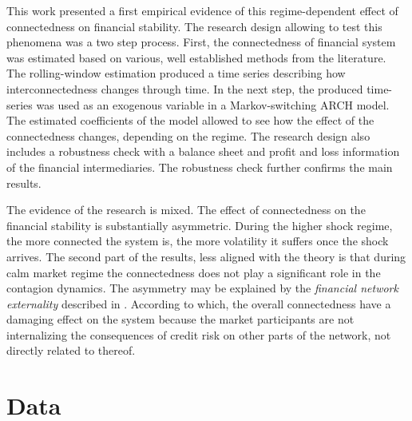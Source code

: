 \documentclass[12pt]{article}
\begin{document}
This work presented a first empirical evidence of this regime-dependent effect of connectedness on financial stability. The research design allowing to test this phenomena was a two step process. First, the connectedness of financial system was estimated based on various, well established methods from the literature. The rolling-window estimation produced a time series describing how interconnectedness changes through time. In the next step, the produced time-series was used as an exogenous variable in a Markov-switching ARCH model. The estimated coefficients of the model allowed to see how the effect of the connectedness changes, depending on the regime. The research design also includes a robustness check with a balance sheet and profit and loss information of the financial intermediaries. The robustness check further confirms the main results.

The evidence of the research is mixed. The effect of connectedness on the financial stability is substantially asymmetric. During the higher shock regime, the more connected the system is, the more volatility it suffers once the shock arrives. The second part of the results, less aligned with the theory is that during calm market regime the connectedness does not play a significant role in the contagion dynamics. The asymmetry may be explained by the \textit{financial network externality} described in \citet{acemoglu15}. According to which, the overall connectedness have a damaging effect on the system because the market participants are not internalizing the consequences of credit risk on other parts of the network, not directly related to thereof.



\newpage

\appendix

\section{Data}\label{appendix:data}
\end{document}
